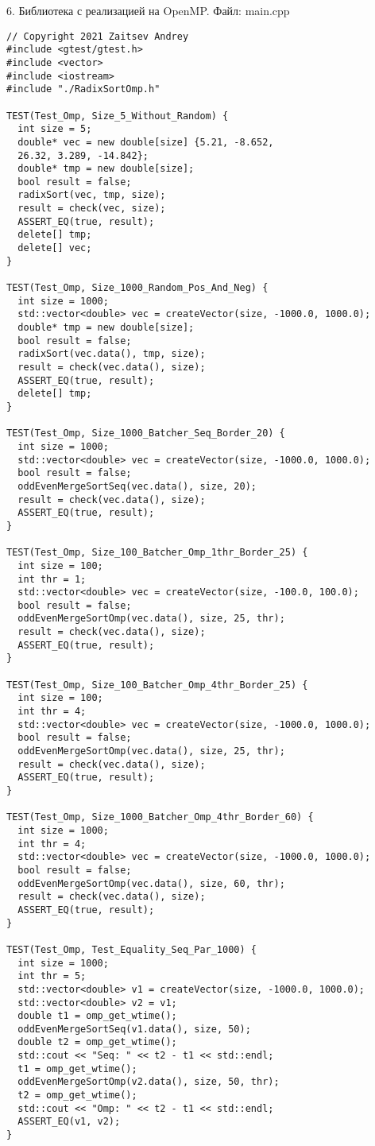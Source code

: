 \documentclass{report}
\begin{document}
\par 6. Библиотека с реализацией на OpenMP. Файл: main.cpp
\begin{lstlisting}
// Copyright 2021 Zaitsev Andrey
#include <gtest/gtest.h>
#include <vector>
#include <iostream>
#include "./RadixSortOmp.h"

TEST(Test_Omp, Size_5_Without_Random) {
  int size = 5;
  double* vec = new double[size] {5.21, -8.652,
  26.32, 3.289, -14.842};
  double* tmp = new double[size];
  bool result = false;
  radixSort(vec, tmp, size);
  result = check(vec, size);
  ASSERT_EQ(true, result);
  delete[] tmp;
  delete[] vec;
}

TEST(Test_Omp, Size_1000_Random_Pos_And_Neg) {
  int size = 1000;
  std::vector<double> vec = createVector(size, -1000.0, 1000.0);
  double* tmp = new double[size];
  bool result = false;
  radixSort(vec.data(), tmp, size);
  result = check(vec.data(), size);
  ASSERT_EQ(true, result);
  delete[] tmp;
}

TEST(Test_Omp, Size_1000_Batcher_Seq_Border_20) {
  int size = 1000;
  std::vector<double> vec = createVector(size, -1000.0, 1000.0);
  bool result = false;
  oddEvenMergeSortSeq(vec.data(), size, 20);
  result = check(vec.data(), size);
  ASSERT_EQ(true, result);
}

TEST(Test_Omp, Size_100_Batcher_Omp_1thr_Border_25) {
  int size = 100;
  int thr = 1;
  std::vector<double> vec = createVector(size, -100.0, 100.0);
  bool result = false;
  oddEvenMergeSortOmp(vec.data(), size, 25, thr);
  result = check(vec.data(), size);
  ASSERT_EQ(true, result);
}

TEST(Test_Omp, Size_100_Batcher_Omp_4thr_Border_25) {
  int size = 100;
  int thr = 4;
  std::vector<double> vec = createVector(size, -1000.0, 1000.0);
  bool result = false;
  oddEvenMergeSortOmp(vec.data(), size, 25, thr);
  result = check(vec.data(), size);
  ASSERT_EQ(true, result);
}

TEST(Test_Omp, Size_1000_Batcher_Omp_4thr_Border_60) {
  int size = 1000;
  int thr = 4;
  std::vector<double> vec = createVector(size, -1000.0, 1000.0);
  bool result = false;
  oddEvenMergeSortOmp(vec.data(), size, 60, thr);
  result = check(vec.data(), size);
  ASSERT_EQ(true, result);
}

TEST(Test_Omp, Test_Equality_Seq_Par_1000) {
  int size = 1000;
  int thr = 5;
  std::vector<double> v1 = createVector(size, -1000.0, 1000.0);
  std::vector<double> v2 = v1;
  double t1 = omp_get_wtime();
  oddEvenMergeSortSeq(v1.data(), size, 50);
  double t2 = omp_get_wtime();
  std::cout << "Seq: " << t2 - t1 << std::endl;
  t1 = omp_get_wtime();
  oddEvenMergeSortOmp(v2.data(), size, 50, thr);
  t2 = omp_get_wtime();
  std::cout << "Omp: " << t2 - t1 << std::endl;
  ASSERT_EQ(v1, v2);
}


\end{lstlisting}
\end{document}
